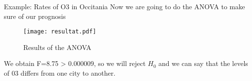 \documentclass[unknownkeysallowed]{beamer}
\begin{document}
\begin{frame}{Example: Rates of O3 in Occitania}
	Now we are going to do the ANOVA to make sure of our prognosis
	\begin{figure}
		\centering
		\texttt{[image: resultat.pdf]}
		\caption{Results of the ANOVA}
		\label{fig:my_label}
	\end{figure}
	We obtain F=8.75 > 0.000009, so we will reject $H_0$ and we can say that the levels of 03 differs from one city to another.
\end{frame}
\end{document}
